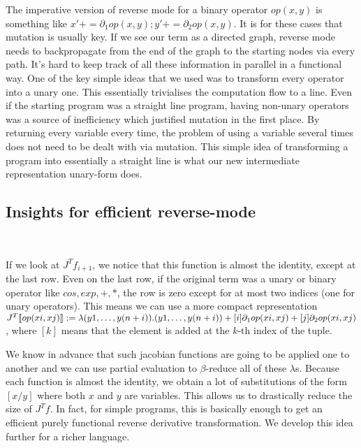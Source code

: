 The imperative version of reverse mode for a binary operator $op(x,y)$ is something like $x'+= \partial_1op(x,y);y'+= \partial_2op(x,y)$. 
It is for these cases that mutation is usually key. 
If we see our term as a directed graph, reverse mode needs to backpropagate from the end of the graph to the starting nodes via every path.
It's hard to keep track of all these information in parallel in a functional way.
One of the key simple ideas that we used was to transform every operator into a unary one. 
This essentially trivialises the computation flow to a line. 
Even if the starting program was a straight line program, 
having non-unary operators was a source of inefficiency which justified mutation in the first place.
By returning every variable every time, the problem of using a variable several times does not need to be dealt with via mutation. 
This simple idea of transforming a program into essentially a straight line is what our new intermediate representation unary-form does. 

\subsection{Insights for efficient reverse-mode}\
\label{subsec:insights}

If we look at $J^Tf_{i+1}$, we notice that this function is almost the identity, except at the last row. 
Even on the last row, if the original term was a unary or binary operator like $cos, exp, +, *$, 
the row is zero except for at most two indices (one for unary operators).
This means we can use a more compact representation $J^T\llbracket op(xi,xj)\rrbracket:=\lambda (y1,\ldots,y(n+i)).(y1,\ldots,y(n+i))+[i]\partial_1op(xi,xj)+[j]\partial_2op(xi,xj)$, 
where $[k]$ means that the element is added at the $k$-th index of the tuple.

We know in advance that such jacobian functions are going to be applied one to another and we can use partial evaluation to $\beta$-reduce all of these $\lambda$s.
Because each function is almost the identity, we obtain a lot of substitutions of the form $[x/y]$ where both $x$ and $y$ are variables. 
This allows us to drastically reduce the size of $J^Tf$. In fact, for simple programs, this is basically enough to get an efficient purely functional reverse derivative transformation.
We develop this idea further for a richer language.
